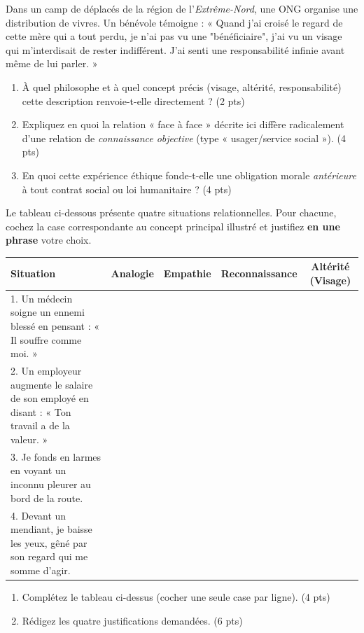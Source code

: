 \documentclass[11pt]{article}
\begin{document}
\begin{exercice}
Dans un camp de déplacés de la région de l'\textit{Extrême-Nord}, une ONG organise une distribution de vivres. Un bénévole témoigne : « Quand j'ai croisé le regard de cette mère qui a tout perdu, je n'ai pas vu une "bénéficiaire", j'ai vu un visage qui m'interdisait de rester indifférent. J'ai senti une responsabilité infinie avant même de lui parler. »
\begin{enumerate}
    \item À quel philosophe et à quel concept précis (visage, altérité, responsabilité) cette description renvoie-t-elle directement ? (2 pts)
    \item Expliquez en quoi la relation « face à face » décrite ici diffère radicalement d'une relation de \textit{connaissance objective} (type « usager/service social »). (4 pts)
    \item En quoi cette expérience éthique fonde-t-elle une obligation morale \textit{antérieure} à tout contrat social ou loi humanitaire ? (4 pts)
\end{enumerate}
\end{exercice}

\begin{exercice}
Le tableau ci-dessous présente quatre situations relationnelles. Pour chacune, cochez la case correspondante au concept principal illustré et justifiez \textbf{en une phrase} votre choix.
\begin{center}
\begin{tabularx}{\linewidth}{|X|c|c|c|c|}
\hline
\textbf{Situation} & \textbf{Analogie} & \textbf{Empathie} & \textbf{Reconnaissance} & \textbf{Altérité (Visage)} \\
\hline
1. Un médecin soigne un ennemi blessé en pensant : « Il souffre comme moi. » & & & & \\
\hline
2. Un employeur augmente le salaire de son employé en disant : « Ton travail a de la valeur. » & & & & \\
\hline
3. Je fonds en larmes en voyant un inconnu pleurer au bord de la route. & & & & \\
\hline
4. Devant un mendiant, je baisse les yeux, gêné par son regard qui me somme d'agir. & & & & \\
\hline
\end{tabularx}
\end{center}
\begin{enumerate}
    \item Complétez le tableau ci-dessus (cocher une seule case par ligne). (4 pts)
    \item Rédigez les quatre justifications demandées. (6 pts)
\end{enumerate}
\end{exercice}
\end{document}
